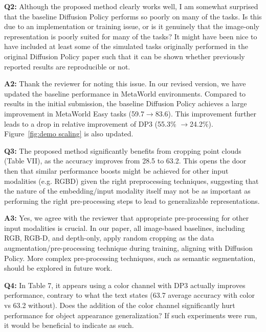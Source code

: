 \vspace{0.1in}

\noindent\textbf{Q2:} Although the proposed method clearly works well, I am somewhat surprised that the baseline Diffusion Policy performs so poorly on many of the tasks. Is this due to an implementation or training issue, or is it genuinely that the image-only representation is poorly suited for many of the tasks? It might have been nice to have included at least some of the simulated tasks originally performed in the original Diffusion Policy paper such that it can be shown whether previously reported results are reproducible or not.

\noindent\textbf{A2:} Thank the reviewer for noting this issue. In our revised version, we have updated the baseline performance in MetaWorld environments. Compared to results in the initial submission, the baseline Diffusion Policy achieves a large improvement in MetaWorld Easy tasks (59.7$\rightarrow$83.6). This improvement further leads to a drop in relative improvement of DP3 (55.3\% $\rightarrow$24.2\%). Figure~\ref{fig:demo scaling} is also updated.

\vspace{0.1in}

\noindent\textbf{Q3:} The proposed method significantly benefits from cropping point clouds (Table VII), as the accuracy improves from 28.5 to 63.2. This opens the door then that similar performance boosts might be achieved for other input modalities (e.g. RGBD) given the right preprocessing techniques, suggesting that the nature of the embedding/input modality itself may not be as important as performing the right pre-processing steps to lead to generalizable representations.

\noindent\textbf{A3:} Yes, we agree with the reviewer that appropriate pre-processing for other input modalities is crucial. In our paper, all image-based baselines, including RGB, RGB-D, and depth-only, apply random cropping as the data augmentation/pre-processing technique during training, aligning with Diffusion Policy. More complex pre-processing techniques, such as semantic segmentation, should be explored in future work.

\vspace{0.1in}

\noindent\textbf{Q4:} In Table 7, it appears using a color channel with DP3 actually improves performance, contrary to what the text states (63.7 average accuracy with color vs 63.2 without). Does the addition of the color channel significantly hurt performance for object appearance generalization? If such experiments were run, it would be beneficial to indicate as such.

